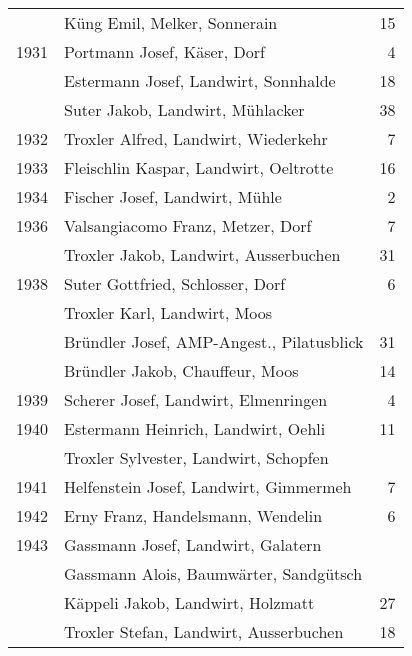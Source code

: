 {\begin{longtable}{ l l r }
                      & Küng Emil, Melker, Sonnerain              & 15          \\
        1931          & Portmann Josef, Käser, Dorf               & 4           \\
                      & Estermann Josef, Landwirt, Sonnhalde      & 18          \\
                      & Suter Jakob, Landwirt, Mühlacker          & 38          \\
        1932          & Troxler Alfred, Landwirt, Wiederkehr      & 7           \\
        1933          & Fleischlin Kaspar, Landwirt, Oeltrotte    & 16          \\
        1934          & Fischer Josef, Landwirt, Mühle            & 2           \\
        1936          & Valsangiacomo Franz, Metzer, Dorf         & 7           \\
                      & Troxler Jakob, Landwirt, Ausserbuchen     & 31          \\
        1938          & Suter Gottfried, Schlosser, Dorf          & 6           \\
                      & Troxler Karl, Landwirt, Moos              &             \\
                      & Bründler Josef, AMP-Angest., Pilatusblick & 31          \\
                      & Bründler Jakob, Chauffeur, Moos           & 14          \\
        1939          & Scherer Josef, Landwirt, Elmenringen      & 4           \\
        1940          & Estermann Heinrich, Landwirt, Oehli       & 11          \\
                      & Troxler Sylvester, Landwirt, Schopfen     &             \\
        1941          & Helfenstein Josef, Landwirt, Gimmermeh    & 7           \\
        1942          & Erny Franz, Handelsmann, Wendelin         & 6           \\
        1943          & Gassmann Josef, Landwirt, Galatern        &             \\
                      & Gassmann Alois, Baumwärter, Sandgütsch    &             \\
                      & Käppeli Jakob, Landwirt, Holzmatt         & 27          \\
                      & Troxler Stefan, Landwirt, Ausserbuchen    & 18          \\

\end{longtable}}
